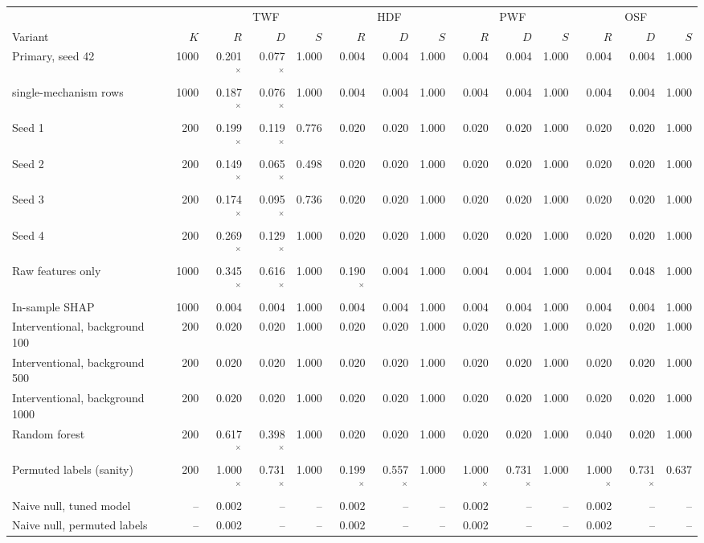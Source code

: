 \begin{tabular}{@{}lrrrrrrrrrrrrr@{}}
\toprule
& & \multicolumn{3}{c}{TWF} & \multicolumn{3}{c}{HDF} & \multicolumn{3}{c}{PWF} & \multicolumn{3}{c}{OSF} \\
\cmidrule(lr){3-5}\cmidrule(lr){6-8}\cmidrule(lr){9-11}\cmidrule(lr){12-14}
Variant & $K$ & $R$ & $D$ & $S$ & $R$ & $D$ & $S$ & $R$ & $D$ & $S$ & $R$ & $D$ & $S$ \\
\midrule
Primary, seed 42 & 1000 & 0.201$^{\times}$ & 0.077$^{\times}$ & 1.000 & 0.004 & 0.004 & 1.000 & 0.004 & 0.004 & 1.000 & 0.004 & 0.004 & 1.000 \\
\quad single-mechanism rows & 1000 & 0.187$^{\times}$ & 0.076$^{\times}$ & 1.000 & 0.004 & 0.004 & 1.000 & 0.004 & 0.004 & 1.000 & 0.004 & 0.004 & 1.000 \\
Seed 1 & 200 & 0.199$^{\times}$ & 0.119$^{\times}$ & 0.776 & 0.020 & 0.020 & 1.000 & 0.020 & 0.020 & 1.000 & 0.020 & 0.020 & 1.000 \\
Seed 2 & 200 & 0.149$^{\times}$ & 0.065$^{\times}$ & 0.498 & 0.020 & 0.020 & 1.000 & 0.020 & 0.020 & 1.000 & 0.020 & 0.020 & 1.000 \\
Seed 3 & 200 & 0.174$^{\times}$ & 0.095$^{\times}$ & 0.736 & 0.020 & 0.020 & 1.000 & 0.020 & 0.020 & 1.000 & 0.020 & 0.020 & 1.000 \\
Seed 4 & 200 & 0.269$^{\times}$ & 0.129$^{\times}$ & 1.000 & 0.020 & 0.020 & 1.000 & 0.020 & 0.020 & 1.000 & 0.020 & 0.020 & 1.000 \\
Raw features only & 1000 & 0.345$^{\times}$ & 0.616$^{\times}$ & 1.000 & 0.190$^{\times}$ & 0.004 & 1.000 & 0.004 & 0.004 & 1.000 & 0.004 & 0.048 & 1.000 \\
In-sample SHAP & 1000 & 0.004 & 0.004 & 1.000 & 0.004 & 0.004 & 1.000 & 0.004 & 0.004 & 1.000 & 0.004 & 0.004 & 1.000 \\
Interventional, background 100 & 200 & 0.020 & 0.020 & 1.000 & 0.020 & 0.020 & 1.000 & 0.020 & 0.020 & 1.000 & 0.020 & 0.020 & 1.000 \\
Interventional, background 500 & 200 & 0.020 & 0.020 & 1.000 & 0.020 & 0.020 & 1.000 & 0.020 & 0.020 & 1.000 & 0.020 & 0.020 & 1.000 \\
Interventional, background 1000 & 200 & 0.020 & 0.020 & 1.000 & 0.020 & 0.020 & 1.000 & 0.020 & 0.020 & 1.000 & 0.020 & 0.020 & 1.000 \\
Random forest & 200 & 0.617$^{\times}$ & 0.398$^{\times}$ & 1.000 & 0.020 & 0.020 & 1.000 & 0.020 & 0.020 & 1.000 & 0.040 & 0.020 & 1.000 \\
Permuted labels (sanity) & 200 & 1.000$^{\times}$ & 0.731$^{\times}$ & 1.000 & 0.199$^{\times}$ & 0.557$^{\times}$ & 1.000 & 1.000$^{\times}$ & 0.731$^{\times}$ & 1.000 & 1.000$^{\times}$ & 0.731$^{\times}$ & 0.637 \\
\midrule
Naive null, tuned model & -- & 0.002 & -- & -- & 0.002 & -- & -- & 0.002 & -- & -- & 0.002 & -- & -- \\
Naive null, permuted labels & -- & 0.002 & -- & -- & 0.002 & -- & -- & 0.002 & -- & -- & 0.002 & -- & -- \\
\bottomrule
\end{tabular}

